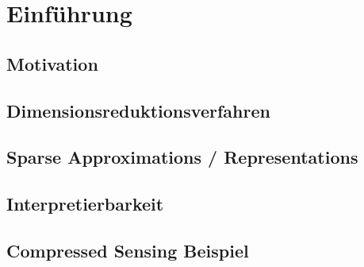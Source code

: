 \chapter{Einführung}

\label{introduction}

\section{Motivation}

\section{Dimensionsreduktionsverfahren}

\section{Sparse Approximations / Representations}

\section{Interpretierbarkeit}

\section{Compressed Sensing Beispiel}